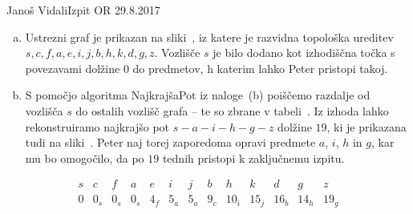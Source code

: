 \begin{naloga}{Janoš Vidali}{Izpit OR 29.8.2017}
\begin{odgovor}
\begin{enumerate}[(a)]
\item Ustrezni graf je prikazan na sliki~\fig,
iz katere je razvidna topološka ureditev
$s, c, f, a, e, i, j, b, h, k, d, g, z$.
Vozlišče $s$ je bilo dodano kot izhodiščna točka
s povezavami dolžine $0$ do predmetov,
h katerim lahko Peter pristopi takoj.

\item S pomočjo algoritma {\sc NajkrajšaPot} iz naloge~\res[topo]{}(b)
poiščemo razdalje od vozlišča $s$ do ostalih vozlišč grafa
-- te so zbrane v tabeli~.
Iz izhoda lahko rekonstruiramo
najkrajšo pot $s - a - i - h - g - z$ dolžine $19$,
ki je prikazana tudi na sliki~\fig.
Peter naj torej zaporedoma opravi predmete $a$, $i$, $h$ in $g$,
kar mu bo omogočilo, da po $19$ tednih pristopi k zaključnemu izpitu.
\end{enumerate}
%
\begin{slika}
\makebox[\textwidth][c]{
\pgfslika
}
\end{slika}
\begin{tabela}
$$
\begin{array}{ccccccccccccc}
s & c & f & a & e & i & j & b & h & k & d & g & z \\ \hline
0 & 0_s & 0_s & 0_s & 4_f & 5_a & 5_a & 9_c & 10_i & 15_j & 16_b & 14_h & 19_g
\end{array}
$$
\end{tabela}
\end{odgovor}
\end{naloga}
